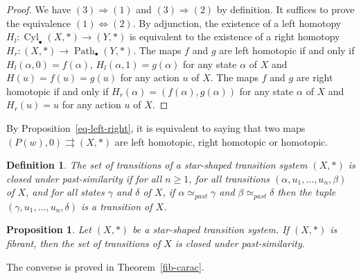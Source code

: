 \documentclass[a4paper,12pt]{amsart}
\newtheorem{prop}[thm]{Proposition}
\newtheorem{defn}[thm]{Definition}
\begin{document}
\begin{proof} We have $(3) \Rightarrow (1)$ and $(3) \Rightarrow (2)$ by
definition. It suffices to prove the equivalence $(1)\Leftrightarrow
(2)$. By adjunction, the existence of a left homotopy
$H_l:\operatorname{{Cyl}}_\bullet(X,*) \to (Y,*)$ is equivalent to the existence of a
right homotopy $H_r:(X,*)\to \operatorname{{Path}}_\bullet(Y,*)$. The maps $f$ and
$g$ are left homotopic if and only if $H_l(\alpha,0)=f(\alpha)$,
$H_l(\alpha,1)=g(\alpha)$ for any state $\alpha$ of $X$ and
$H(u)=f(u)=g(u)$ for any action $u$ of $X$. The maps $f$ and $g$ are
right homotopic if and only if $H_r(\alpha)=(f(\alpha),g(\alpha))$ for
any state $\alpha$ of $X$ and $H_r(u)=u$ for any action $u$ of $X$.
\end{proof}

By Proposition~\ref{eq-left-right}, it is equivalent to saying that
two maps $(P(w),0)\rightrightarrows (X,*)$ are left homotopic, right
homotopic or homotopic.

\begin{defn} The set of transitions of a star-shaped transition system $(X,*)$
is {\rm closed under past-similarity} if for all $n {\geqslant} 1$, for all
transitions $(\alpha,u_1,\dots,u_n,\beta)$ of $X$, and for all states
$\gamma$ and $\delta$ of $X$, if $\alpha \simeq_{past} \gamma$ and
$\beta \simeq_{past} \delta$ then the tuple
$(\gamma,u_1,\dots,u_n,\delta)$ is a transition of $X$. \end{defn}

\begin{prop} \label{fib-carac-demi} Let $(X,*)$ be a star-shaped transition
system. If $(X,*)$ is fibrant, then the set of transitions of $X$ is
closed under past-similarity. \end{prop}

The converse is proved in Theorem~\ref{fib-carac}.
\end{document}
